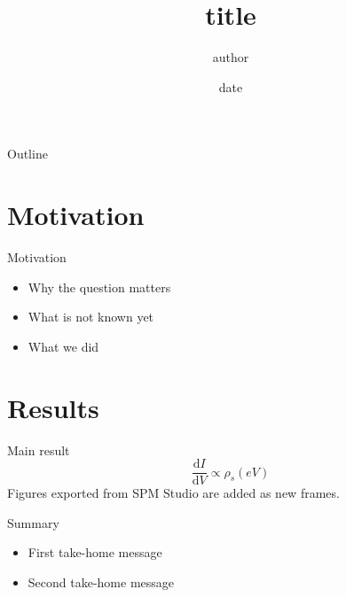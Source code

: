 \documentclass[aspectratio=169,11pt]{beamer}
\title{ {{title}} }
\author{ {{author}} }
\institute{Institution}
\date{ {{date}} }
\begin{document}
\begin{frame}
  \titlepage
\end{frame}

\begin{frame}{Outline}
  \tableofcontents
\end{frame}

\section{Motivation}
\begin{frame}{Motivation}
  \begin{itemize}
    \item Why the question matters
    \item What is not known yet
    \item What we did
  \end{itemize}
\end{frame}

\section{Results}
\begin{frame}{Main result}
  \begin{equation*}
    \frac{\mathrm{d}I}{\mathrm{d}V} \propto \rho_s(eV)
  \end{equation*}
  Figures exported from SPM Studio are added as new frames.
\end{frame}

\begin{frame}{Summary}
  \begin{itemize}
    \item First take-home message
    \item Second take-home message
  \end{itemize}
\end{frame}
\end{document}
